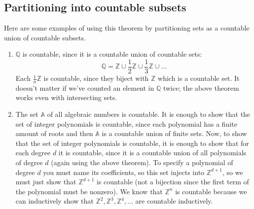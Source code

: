 \subsection{Partitioning into countable subsets}
Here are some examples of using this theorem by partitioning sets as a countable union of countable subsets.
\begin{enumerate}
	\item \(\mathbb Q\) is countable, since it is a countable union of countable sets:
	      \[
		      \mathbb Q = \mathbb Z \cup \frac{1}{2}\mathbb Z \cup \frac{1}{3}\mathbb Z \cup \dots
	      \]
	      Each \(\frac{1}{n}\mathbb Z\) is countable, since they biject with \(\mathbb Z\) which is a countable set.
	      It doesn't matter if we've counted an element in \(\mathbb Q\) twice; the above theorem works even with intersecting sets.
	\item The set \(\mathbb A\) of all algebraic numbers is countable.
	      It is enough to show that the set of integer polynomials is countable, since each polynomial has a finite amount of roots and then \(\mathbb A\) is a countable union of finite sets.
	      Now, to show that the set of integer polynomials is countable, it is enough to show that for each degree \(d\) it is countable, since it is a countable union of all polynomials of degree \(d\) (again using the above theorem).
	      To specify a polynomial of degree \(d\) you must name its coefficients, so this set injects into \(\mathbb Z^{d+1}\), so we must just show that \(\mathbb Z^{d+1}\) is countable (not a bijection since the first term of the polynomial must be nonzero).
	      We know that \(\mathbb Z^n\) is countable because we can inductively show that \(\mathbb Z^2, \mathbb Z^3, \mathbb Z^4, \dots\) are countable inductively.
\end{enumerate}

